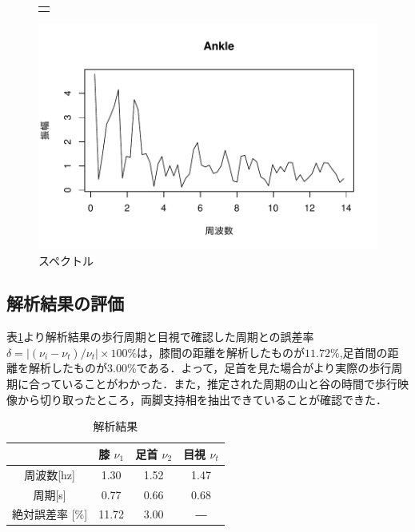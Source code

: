 \documentclass[a4j]{cis-resume}
\begin{document}
\begin{figure}[H]
\begin{flushleft}
\begin{tabular}{c}
\begin{minipage}{0.3\linewidth}
\begin{center}
      \end{center}
    \end{minipage}
  \end{tabular}
      \vspace{18mm}
      \begin{flushleft}
        \hspace{1mm}
        \includegraphics[keepaspectration,scale=0.3\figscale,angle=0]{Ankle.pdf}
      \end{flushleft}
  \caption{スペクトル} \label{fig:変換}
\end{flushleft}
\end{figure}
\subsection{解析結果の評価}
表\ref{tab:結果}より解析結果の歩行周期と目視で確認した周期との誤差率$\delta =|(\nu_i-\nu_t)/\nu_t|\times100\%$は，膝間の距離を解析したものが$11.72\%$,足首間の距離を解析したものが$3.00\%$である．よって，足首を見た場合がより実際の歩行周期に合っていることがわかった．また，推定された周期の山と谷の時間で歩行映像から切り取ったところ，両脚支持相を抽出できていることが確認できた．
\begin{table}[H]
  \caption{解析結果} \label{tab:結果}
  \begin{tabular}{c||ccc}
    \hline
            & 膝 $\nu_1$    & 足首 $\nu_2$  & 目視 $\nu_t$  \\ \hline
周波数{[}hz{]} & 1.30  & 1.52 & 1.47 \\ \hline
周期{[}s{]}   & 0.77  & 0.66 & 0.68 \\ \hline
絶対誤差率 {[}$\%${]}      & 11.72 & 3.00 &   ―   \\ \hline
  \end{tabular}
\end{table}
\end{document}
